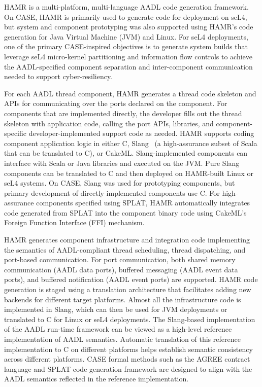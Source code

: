 
HAMR \cite{hamr} is a multi-platform, multi-language
AADL code generation framework.  On CASE, HAMR is primarily used
to generate code for deployment on seL4, but system and component
prototyping was also supported using HAMR's code generation for
Java Virtual Machine (JVM) and Linux.  For seL4 deployments, one of the
primary CASE-inspired objectives is to generate system builds that
leverage seL4 micro-kernel partitioning and information flow
controls to achieve the AADL-specified component separation and
inter-component communication needed to support cyber-resiliency.

For each AADL thread component, HAMR generates a thread code
skeleton and APIs for communicating over the ports declared on
the component.  For components that are implemented directly, the
developer fills out the thread skeleton with application code,
calling the port APIs, libraries, and component-specific
developer-implemented support code as needed.
HAMR supports coding component application logic in either C,
Slang~\cite{slang} (a high-assurance subset of Scala that can be translated to
C), or CakeML.  Slang-implemented components can interface with
Scala or Java libraries and executed on the JVM.  Pure Slang
components can be translated to C and then deployed on HAMR-built
Linux or seL4 systems.  On CASE, Slang was used for prototyping
components, but primary development of directly implemented
components use C.  For high-assurance components specified
using SPLAT, HAMR automatically integrates code generated from
SPLAT into the component binary code using CakeML's Foreign
Function Interface (FFI) mechanism.

HAMR generates component infrastructure and integration code
implementing the semantics of AADL-compliant thread scheduling,
thread dispatching, and port-based communication.
For port communication, both shared memory communication (AADL
data ports), buffered messaging (AADL event data ports), and
buffered notification (AADL event ports) are supported.
HAMR code generation is staged using a translation architecture
that facilitates adding new backends for different target
platforms.   Almost all the infrastructure code is implemented
in Slang, which can then be used for JVM deployments or
translated to C for Linux or seL4 deployments.
The Slang-based implementation of the AADL run-time framework
can be viewed as a high-level reference implementation of AADL
semantics.   Automatic translation of this reference
implementation to C on different platforms helps establish
semantic consistency across different platforms. 
CASE formal methods such as the AGREE contract language and SPLAT
code generation framework are designed to align with the AADL
semantics reflected in the reference implementation.  

